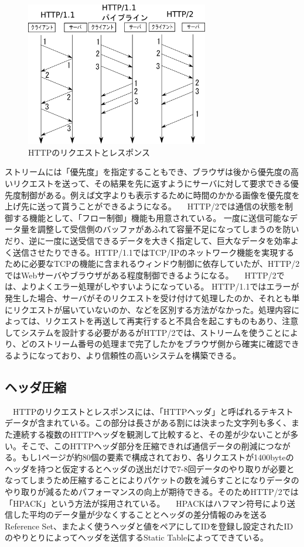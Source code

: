\documentclass[a4j,9pt,twocolumn]{jsarticle}
\begin{document}
\begin{figure}[h]
\centering
\includegraphics[width=80mm]{img/RR.eps}
\caption{HTTPのリクエストとレスポンス}
\end{figure}


ストリームには「優先度」を指定することもでき、ブラウザは後から優先度の高いリクエストを送って、その結果を先に返すようにサーバに対して要求できる優先度制御がある。例えば文字よりも表示するために時間のかかる画像を優先度を上げ先に送って貰うことができるようになる。
　HTTP/2では通信の状態を制御する機能として、「フロー制御」機能も用意されている。
一度に送信可能なデータ量を調整して受信側のバッファがあふれて容量不足になってしまうのを防いだり、逆に一度に送受信できるデータを大きく指定して、巨大なデータを効率よく送信させたりできる。HTTP/1.1ではTCP/IPのネットワーク機能を実現するために必要なTCPの機能に含まれるウィンドウ制御に依存していたが、HTTP/2ではWebサーバやブラウザがある程度制御できるようになる。
　HTTP/2では、よりよくエラー処理がしやすいようになっている。 HTTP/1.1ではエラーが発生した場合、サーバがそのリクエストを受け付けて処理したのか、それとも単にリクエストが届いていないのか、などを区別する方法がなかった。処理内容によっては、リクエストを再送して再実行すると不具合を起こすものもあり、注意してシステムを設計する必要があるがHTTP/2では、ストリームを使うことにより、どのストリーム番号の処理まで完了したかをブラウザ側から確実に確認できるようになっており、より信頼性の高いシステムを構築できる。






\subsection{ヘッダ圧縮}
　HTTPのリクエストとレスポンスには、「HTTPヘッダ」と呼ばれるテキストデータが含まれている。この部分は長さがある割には決まった文字列も多く、また連続する複数のHTTPヘッダを観測して比較すると、その差が少ないことが多い。そこで、このHTTPヘッダ部分を圧縮できれば通信データの削減につながる。もし1ページが約80個の要素で構成されており、各リクエストが1400byteのヘッダを持つと仮定するとヘッダの送出だけで7-8回データのやり取りが必要となってしまうため圧縮することによりパケットの数を減らすことになりデータのやり取りが減るためパフォーマンスの向上が期待できる。そのためHTTP/2では「HPACK」という方法が採用されている。
　HPACKはハフマン符号により送信した平均のデータ量が少なくすることとヘッダの差分情報のみを送るReference Set、またよく使うヘッダと値をペアにしてIDを登録し設定されたIDのやりとりによってヘッダを送信するStatic Tableによってできている。
\end{document}
